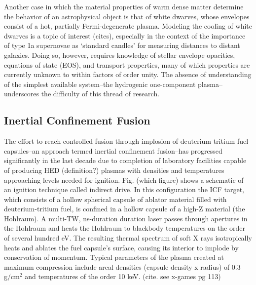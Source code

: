 
Another case in which the material properties of warm dense matter determine the behavior of an astrophysical object is that of white dwarves, whose envelopes consist of a hot, partially Fermi-degenerate plasma. Modeling the cooling of white dwarves is a topic of interest (cites), especially in the context of the importance of type 1a supernovae as `standard candles' for measuring distances to distant galaxies. Doing so, however, requires knowledge of stellar envelope opacities, equations of state (EOS), and transport properties, many of which properties are currently unknown to within factors of order unity. The absence of understanding of the simplest available system--the hydrogenic one-component plasma--underscores the difficulty of this thread of research.

\subsection{Inertial Confinement Fusion}
The effort to reach controlled fusion through implosion of deuterium-tritium fuel capsules--an approach termed inertial confinement fusion--has progressed significantly in the last decade due to completion of laboratory facilities capable of producing HED (definition?) plasmas with densities and temperatures approaching levels needed for ignition. Fig. (which figure) shows a schematic of an ignition technique called indirect drive. In this configuration the ICF target, which consists of a hollow spherical capsule of ablator material filled with deuterium-tritium fuel, is confined in a hollow capsule of a high-Z material (the Hohlraum). A multi-TW, ns-duration duration laser passes through apertures in the Hohlraum and heats the Hohlraum to blackbody temperatures on the order of several hundred eV. The resulting thermal spectrum of soft X rays isotropically heats and ablates the fuel capsule's surface, causing its interior to implode by conservation of momentum. Typical parameters of the plasma created at maximum compression include areal densities (capsule density x radius) of 0.3 g/cm$^2$ and temperatures of the order 10 keV. (cite. see x-games pg 113)

